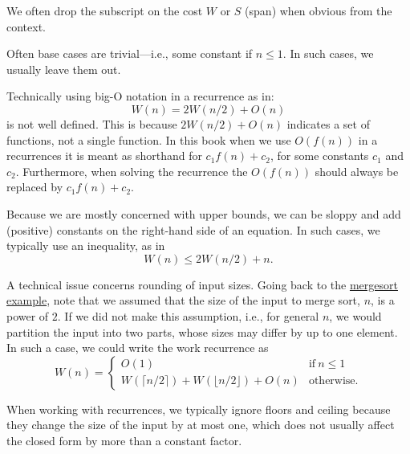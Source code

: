 \begin{gram}
We often drop the subscript on the cost $W$ or $S$ (span) when obvious from the context.
\end{gram}
%

\begin{gram}
Often  base cases are trivial---i.e., some constant if $n
\leq 1$.  In such cases, we usually leave them out.
\end{gram}
%

\begin{gram}
Technically using big-O notation in a recurrence as in:
\[ 
W(n) = 2 W(n/2) + O(n) 
\]
%
is not well defined.   
%
This is because $2 W(n/2) + O(n)$ indicates a
set of functions, not a single function.    
%
In this book when we use
$O(f(n))$ in a recurrences it is meant as shorthand for $c_1 f(n) +
c_2$, for some constants $c_1$ and $c_2$. 
% 
Furthermore, when solving the recurrence the $O(f(n))$ should
always be replaced by $c_1 f(n) + c_2$.
\end{gram}
%

\begin{gram}[Inequality]
Because we are mostly concerned with upper bounds,  we can be  sloppy and 
add (positive) constants on the right-hand side of an equation.
%
In such cases, we typically use an inequality, as in
\[ 
W(n) \leq 2 W(n/2) + n.
\]
\end{gram}
%
\begin{gram}
A technical issue concerns rounding of input sizes.
%
Going back to the \href{ex:analysis::recurrences::mergesort}{mergesort example}, note that we assumed that the size
of the input to merge sort, $n$, is a power of $2$.
%
If we did not make this assumption, i.e., for general $n$, 
we would partition the input into two parts, whose sizes may differ by up to one element.
%
In such a case, we could write the work recurrence as 
\[
W(n) = \left\{
\begin{array}{ll}
O(1) & \mbox{if} ~ n \le 1
\\
W(\lceil n/2 \rceil) + W(\lfloor n/2 \rfloor) + O(n) &  \mbox{otherwise}.
\end{array}
\right.
\]
%

When working with recurrences, we typically ignore floors and ceiling
because they change the size of the input by at most one, which
does not usually affect the closed form by more than a constant
factor.
\end{gram}

